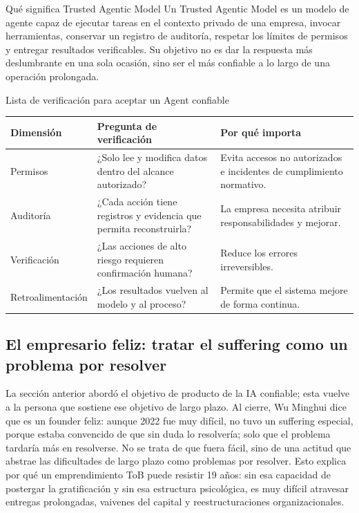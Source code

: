 \begin{importantbox}{Qué significa Trusted Agentic Model}
Un Trusted Agentic Model es un modelo de agente capaz de ejecutar tareas en el contexto privado de una empresa, invocar herramientas, conservar un registro de auditoría, respetar los límites de permisos y entregar resultados verificables. Su objetivo no es dar la respuesta más deslumbrante en una sola ocasión, sino ser el más confiable a lo largo de una operación prolongada.
\end{importantbox}

\begin{knowledgebox}{Lista de verificación para aceptar un Agent confiable}
\begin{tabularx}{\textwidth}{p{}p{}X}
\toprule
Dimensión & Pregunta de verificación & Por qué importa \\
\midrule
Permisos & ¿Solo lee y modifica datos dentro del alcance autorizado? & Evita accesos no autorizados e incidentes de cumplimiento normativo. \\
Auditoría & ¿Cada acción tiene registros y evidencia que permita reconstruirla? & La empresa necesita atribuir responsabilidades y mejorar. \\
Verificación & ¿Las acciones de alto riesgo requieren confirmación humana? & Reduce los errores irreversibles. \\
Retroalimentación & ¿Los resultados vuelven al modelo y al proceso? & Permite que el sistema mejore de forma continua. \\
\bottomrule
\end{tabularx}
\end{knowledgebox}

\subsection{El empresario feliz: tratar el suffering como un problema por resolver}

La sección anterior abordó el objetivo de producto de la IA confiable; esta vuelve a la persona que sostiene ese objetivo de largo plazo. Al cierre, Wu Minghui dice que es un founder feliz: aunque 2022 fue muy difícil, no tuvo un suffering especial, porque estaba convencido de que sin duda lo resolvería; solo que el problema tardaría más en resolverse. No se trata de que fuera fácil, sino de una actitud que abstrae las dificultades de largo plazo como problemas por resolver. Esto explica por qué un emprendimiento ToB puede resistir 19 años: sin esa capacidad de postergar la gratificación y sin esa estructura psicológica, es muy difícil atravesar entregas prolongadas, vaivenes del capital y reestructuraciones organizacionales.

